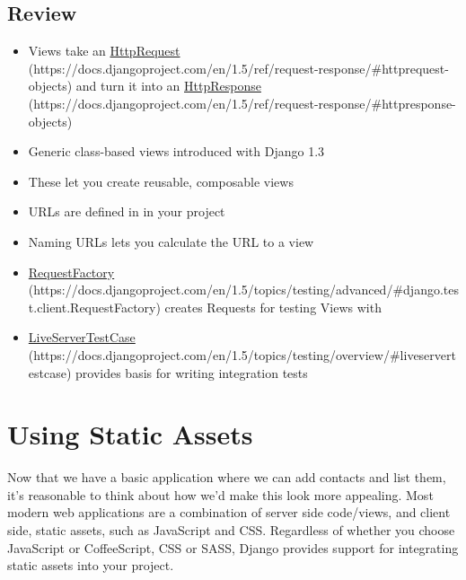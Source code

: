 \documentclass[letterpaper,10pt,english]{sphinxmanual}
\begin{document}
\section{Review}
\label{tutorial/views:review}\begin{itemize}
\item {} 
Views take an \href{https://docs.djangoproject.com/en/1.5/ref/request-response/\#httprequest-objects}{HttpRequest} (https://docs.djangoproject.com/en/1.5/ref/request-response/\#httprequest-objects) and turn it into an \href{https://docs.djangoproject.com/en/1.5/ref/request-response/\#httpresponse-objects}{HttpResponse} (https://docs.djangoproject.com/en/1.5/ref/request-response/\#httpresponse-objects)

\item {} 
Generic class-based views introduced with Django 1.3

\item {} 
These let you create reusable, composable views

\item {} 
URLs are defined in  in your project

\item {} 
Naming URLs lets you calculate the URL to a view

\item {} 
\href{https://docs.djangoproject.com/en/1.5/topics/testing/advanced/\#django.test.client.RequestFactory}{RequestFactory} (https://docs.djangoproject.com/en/1.5/topics/testing/advanced/\#django.test.client.RequestFactory) creates Requests for testing Views
with

\item {} 
\href{https://docs.djangoproject.com/en/1.5/topics/testing/overview/\#liveservertestcase}{LiveServerTestCase} (https://docs.djangoproject.com/en/1.5/topics/testing/overview/\#liveservertestcase) provides basis for writing integration tests

\end{itemize}


\chapter{Using Static Assets}
\label{tutorial/static::doc}\label{tutorial/static:using-static-assets}\label{tutorial/static:selenium}
Now that we have a basic application where we can add contacts and
list them, it's reasonable to think about how we'd make this look more
appealing. Most modern web applications are a combination of server
side code/views, and client side, static assets, such as JavaScript
and CSS. Regardless of whether you choose JavaScript or CoffeeScript,
CSS or SASS, Django provides support for integrating static assets
into your project.
\end{document}
